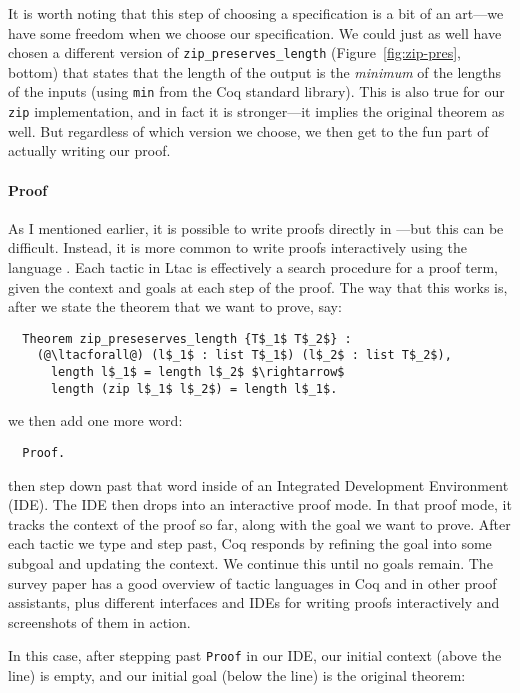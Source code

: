 It is worth noting that this step of choosing a specification is a bit of an art---we have some freedom when we choose our specification.
We could just as well have chosen a different version of \lstinline{zip_preserves_length} (Figure~\ref{fig:zip-pres}, bottom)
that states that the length of the output is the \textit{minimum} of the lengths of the inputs (using \lstinline{min} from the Coq standard library).
This is also true for our \lstinline{zip} implementation, and in fact it is stronger---it implies the original theorem as well.
But regardless of which version we choose, we then get to the fun part of actually writing our proof.

\paragraph{Proof} As I mentioned earlier, it is possible to write proofs directly in ---but this can be difficult.
Instead, it is more common to write proofs interactively using the  language .
Each tactic in Ltac is effectively a search procedure for a proof term, given the context and goals at each step of the proof.
The way that this works is, after we state the theorem that we want to prove, say:

\begin{lstlisting}
  Theorem zip_preseserves_length {T$_1$ T$_2$} :
    (@\ltacforall@) (l$_1$ : list T$_1$) (l$_2$ : list T$_2$),
      length l$_1$ = length l$_2$ $\rightarrow$
      length (zip l$_1$ l$_2$) = length l$_1$.
\end{lstlisting}
we then add one more word:

\begin{lstlisting}
  Proof.
\end{lstlisting}
then step down past that word inside of an Integrated Development Environment (IDE). %
The IDE then drops into an interactive proof mode.
In that proof mode, it tracks the context of the proof so far, along with the goal we want to prove.
After each tactic we type and step past, Coq responds by refining the goal into some subgoal
and updating the context.
We continue this until no goals remain.
The  survey paper has a good overview of tactic languages in Coq and in other proof assistants,
plus different interfaces and IDEs for writing proofs interactively and screenshots of them in action.

In this case, after stepping past \lstinline{Proof} in our IDE, 
our initial context (above the line) is empty, and our initial goal (below the line) is the original theorem:

